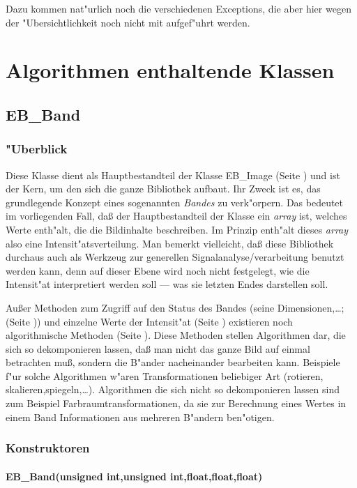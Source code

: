 \documentclass[12pt,a4paper,draft,twoside,onecolumn,titlepage]{book}
\newcommand{\pref}[1]{(Seite \pageref{#1})}
\newcommand{\class}[1]{{\sc #1}}
\newcommand{\arglist}[1]{\footnotesize{#1}}
\begin{document}
Dazu kommen nat"urlich noch die verschiedenen Exceptions, die aber hier wegen der "Ubersichtlichkeit noch nicht mit aufgef"uhrt werden.
\part{Algorithmen enthaltende Klassen}
\chapter{\class{EB\_Band}}
\label{classebband}
\section{"Uberblick}
Diese Klasse dient als Hauptbestandteil der Klasse EB\_Image \pref{classebimage} und ist der Kern, um den sich die ganze Bibliothek aufbaut. Ihr Zweck ist es, das grundlegende Konzept eines sogenannten {\em Bandes} zu verk"orpern. Das bedeutet im vorliegenden Fall, da{\ss} der Hauptbestandteil der Klasse ein {\it array} ist, welches Werte enth"alt, die die Bildinhalte beschreiben. Im Prinzip enth"alt dieses {\it array} also eine Intensit"atsverteilung. Man bemerkt vielleicht, da{\ss} diese Bibliothek durchaus auch als Werkzeug zur generellen Signalanalyse/verarbeitung benutzt werden kann, denn auf dieser Ebene wird noch nicht festgelegt, wie die Intensit"at interpretiert werden soll --- was sie letzten Endes darstellen soll. 

Au{\ss}er Methoden zum Zugriff auf den Status des Bandes (seine Dimensionen,\ldots;\pref{ebbandorgm}) und einzelne Werte der Intensit"at \pref{ebbandsinglem} existieren noch algorithmische Methoden \pref{ebbandmethodm}. Diese Methoden stellen Algorithmen dar, die sich so dekomponieren lassen, da{\ss} man nicht das ganze Bild auf einmal betrachten mu{\ss}, sondern die B"ander nacheinander bearbeiten kann. Beispiele f"ur solche Algorithmen w"aren Transformationen beliebiger Art (rotieren, skalieren,spiegeln,\ldots). Algorithmen die sich nicht so dekomponieren lassen sind zum Beispiel Farbraumtransformationen, da sie zur Berechnung eines Wertes in einem Band Informationen aus mehreren B"andern ben"otigen. 
\section{Konstruktoren}
\subsection{EB\_Band\arglist{(unsigned int,unsigned int,float,float,float)}}
\end{document}
